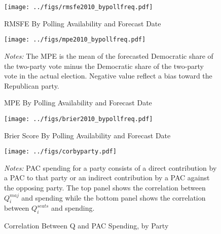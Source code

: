 \documentclass[12pt,final,fleqn]{article}
\theoremstyle{plain}
\begin{document}
\begin{appendices}
\begin{figure}[!htb]
\begin{center}
\texttt{[image: ../figs/rmsfe2010\_bypollfreq.pdf]}
\vspace{.5cm}
\caption{RMSFE By Polling Availability and Forecast Date}
\label{fig:RMSFE By Polling Availability and Forecast Date}
\begin{minipage}{\linewidth}
\footnotesize
\end{minipage}
\end{center}
\end{figure}

\begin{figure}[!htb]
\begin{center}
\texttt{[image: ../figs/mpe2010\_bypollfreq.pdf]}
\vspace{.5cm}
\caption{MPE By Polling Availability and Forecast Date}
\label{fig:MPE By Polling Availability and Forecast Date}
\begin{minipage}{\linewidth}
\footnotesize
\emph{Notes:} The MPE is the mean of the forecasted Democratic share of the two-party vote minus the Democratic share of the two-party vote in the actual election. Negative value reflect a bias toward the Republican party.
\end{minipage}
\end{center}
\end{figure}

\begin{figure}[!htb]
\begin{center}
\texttt{[image: ../figs/brier2010\_bypollfreq.pdf]}
\vspace{.5cm}
\caption{Brier Score By Polling Availability and Forecast Date}
\label{fig:Brier Score By Polling Availability and Forecast Date}
\begin{minipage}{\linewidth}
\footnotesize
\end{minipage}
\end{center}
\end{figure}

\begin{figure}[!htb]
\texttt{[image: ../figs/corbyparty.pdf]}
\vspace{.5cm}
\caption{Correlation Between Q and PAC Spending, by Party}
\label{fig:Correlation Between Q and PAC Spending, by Party}
\begin{minipage}{\linewidth}
\footnotesize
\emph{Notes:} PAC spending for a party consists of a direct contribution by a PAC to that party or an indirect contribution by a PAC against the opposing party. The top panel shows the correlation between $Q_i^{maj}$ and spending while the bottom panel shows the correlation between $Q_i^{seats}$ and spending.
\end{minipage}
\end{figure}


\end{appendices}
\end{document}
